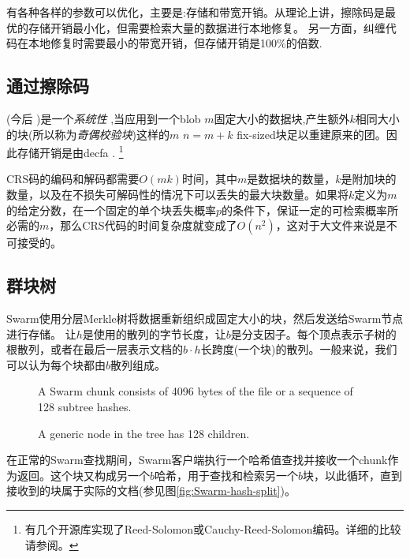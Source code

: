 有各种各样的参数可以优化，主要是:存储和带宽开销。从理论上讲，擦除码是最优的存储开销最小化，但需要检索大量的数据进行本地修复。
另一方面，纠缠代码在本地修复时需要最小的带宽开销，但存储开销是100\%的倍数. 

\subsection{通过擦除码}\label{sec:erasure}


(今后 \cite{lubyetal1995CRS} \cite{plank2006optimizing})是一个\emph{系统性} ,当应用到一个blob $m$固定大小的数据块,产生额外$k$相同大小的块(所以称为\emph{奇偶校验块})这样的$m$ $n=m+k$ fix-sized块足以重建原来的团。因此存储开销是由decfa .%
%
\footnote{%
有几个开源库实现了Reed-Solomon或Cauchy-Reed-Solomon编码。详细的比较请参阅\cite{plank2009performance}。}

CRS码的编码和解码都需要$O(mk)$时间，其中$m$是数据块的数量，$k$是附加块的数量，以及在不损失可解码性的情况下可以丢失的最大块数量。如果将$k$定义为$m$的给定分数，在一个固定的单个块丢失概率$p$的条件下，保证一定的可检索概率所必需的$m$，那么CRS代码的时间复杂度就变成了$O(n^2)$，这对于大文件来说是不可接受的。 

\subsection{群块树}

Swarm使用分层Merkle树\cite{merkle1980protocols}将数据重新组织成固定大小的块，然后发送给Swarm节点进行存储。
让$h$是使用的散列的字节长度，让$b$是分支因子。每个顶点表示子树的根散列，或者在最后一层表示文档的$b\cdot h$长跨度(一个块)的散列。一般来说，我们可以认为每个块都由$b$散列组成。


\begin{figure}[htbp]
   \centering
   
   \caption[Swarm chunk \statusgreen]{A Swarm chunk consists of 4096 bytes of the file or a sequence of 128 subtree hashes.}
   \label{fig:chunk}
\end{figure}


\begin{figure}[htbp]
   \centering
   
   \caption[A generic node in the tree has 128 children \statusgreen]{A generic node in the tree has 128 children.}
   \label{fig:Swarm-hash-basic}
\end{figure}

在正常的Swarm查找期间，Swarm客户端执行一个哈希值查找并接收一个chunk作为返回。这个块又构成另一个$b$哈希，用于查找和检索另一个$b$块，以此循环，直到接收到的块属于实际的文档(参见图\ref{fig:Swarm-hash-split})。


